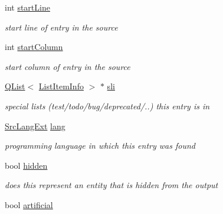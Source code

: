 \begin{DoxyCompactItemize}
int \mbox{\hyperlink{class_entry_a81bf40c0a6646dc1e33097d7e2552c96}{start\+Line}}
\begin{DoxyCompactList}\small\item\em start line of entry in the source \end{DoxyCompactList}\item 
\mbox{\label{class_entry_a59c06b1f3be3c3220404df1d3fdc5bfb}} 
int \mbox{\hyperlink{class_entry_a59c06b1f3be3c3220404df1d3fdc5bfb}{start\+Column}}
\begin{DoxyCompactList}\small\item\em start column of entry in the source \end{DoxyCompactList}\item 
\mbox{\label{class_entry_a5328bd7f1580a30ad2345840044c2a4b}} 
\mbox{\hyperlink{class_q_list}{Q\+List}}$<$ \mbox{\hyperlink{struct_list_item_info}{List\+Item\+Info}} $>$ $\ast$ \mbox{\hyperlink{class_entry_a5328bd7f1580a30ad2345840044c2a4b}{sli}}
\begin{DoxyCompactList}\small\item\em special lists (test/todo/bug/deprecated/..) this entry is in \end{DoxyCompactList}\item 
\mbox{\label{class_entry_a4ee5bbd6ac8bdf2f017d93edcefce5e9}} 
\mbox{\hyperlink{types_8h_a9974623ce72fc23df5d64426b9178bf2}{Src\+Lang\+Ext}} \mbox{\hyperlink{class_entry_a4ee5bbd6ac8bdf2f017d93edcefce5e9}{lang}}
\begin{DoxyCompactList}\small\item\em programming language in which this entry was found \end{DoxyCompactList}\item 
\mbox{\label{class_entry_acc4d59ae7ae3e94c3365ab8027593727}} 
bool \mbox{\hyperlink{class_entry_acc4d59ae7ae3e94c3365ab8027593727}{hidden}}
\begin{DoxyCompactList}\small\item\em does this represent an entity that is hidden from the output \end{DoxyCompactList}\item 
\mbox{\label{class_entry_acbe763144d791b44aa3620b012d0dd30}} 
bool \mbox{\hyperlink{class_entry_acbe763144d791b44aa3620b012d0dd30}{artificial}}

\end{DoxyCompactItemize}
